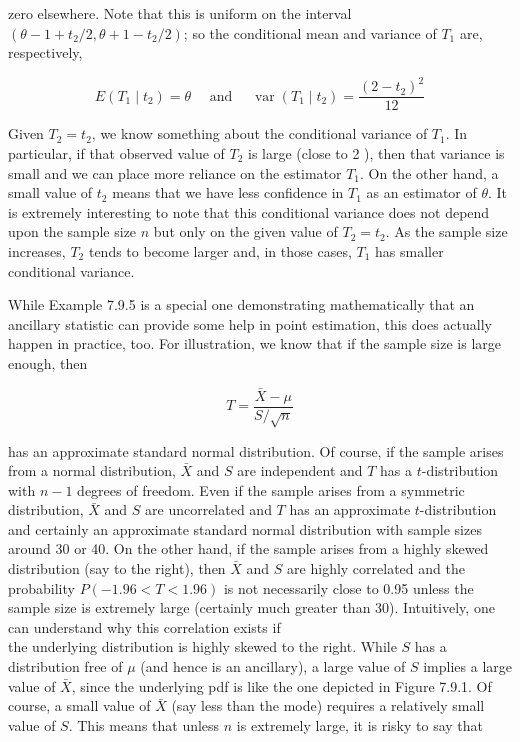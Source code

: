 zero elsewhere. Note that this is uniform on the interval $\left(\theta-1+t_{2} / 2, \theta+1-t_{2} / 2\right)$; so the conditional mean and variance of $T_{1}$ are, respectively,

$$
E\left(T_{1} \mid t_{2}\right)=\theta \quad \text { and } \quad \operatorname{var}\left(T_{1} \mid t_{2}\right)=\frac{\left(2-t_{2}\right)^{2}}{12}
$$

Given $T_{2}=t_{2}$, we know something about the conditional variance of $T_{1}$. In particular, if that observed value of $T_{2}$ is large (close to 2 ), then that variance is small and we can place more reliance on the estimator $T_{1}$. On the other hand, a small value of $t_{2}$ means that we have less confidence in $T_{1}$ as an estimator of $\theta$. It is extremely interesting to note that this conditional variance does not depend upon the sample size $n$ but only on the given value of $T_{2}=t_{2}$. As the sample size increases, $T_{2}$ tends to become larger and, in those cases, $T_{1}$ has smaller conditional variance.

While Example 7.9.5 is a special one demonstrating mathematically that an ancillary statistic can provide some help in point estimation, this does actually happen in practice, too. For illustration, we know that if the sample size is large enough, then

$$
T=\frac{\bar{X}-\mu}{S / \sqrt{n}}
$$

has an approximate standard normal distribution. Of course, if the sample arises from a normal distribution, $\bar{X}$ and $S$ are independent and $T$ has a $t$-distribution with $n-1$ degrees of freedom. Even if the sample arises from a symmetric distribution, $\bar{X}$ and $S$ are uncorrelated and $T$ has an approximate $t$-distribution and certainly an approximate standard normal distribution with sample sizes around 30 or 40. On the other hand, if the sample arises from a highly skewed distribution (say to the right), then $\bar{X}$ and $S$ are highly correlated and the probability $P(-1.96<T<1.96)$ is not necessarily close to 0.95 unless the sample size is extremely large (certainly much greater than 30). Intuitively, one can understand why this correlation exists if\\
the underlying distribution is highly skewed to the right. While $S$ has a distribution free of $\mu$ (and hence is an ancillary), a large value of $S$ implies a large value of $\bar{X}$, since the underlying pdf is like the one depicted in Figure 7.9.1. Of course, a small value of $\bar{X}$ (say less than the mode) requires a relatively small value of $S$. This means that unless $n$ is extremely large, it is risky to say that


